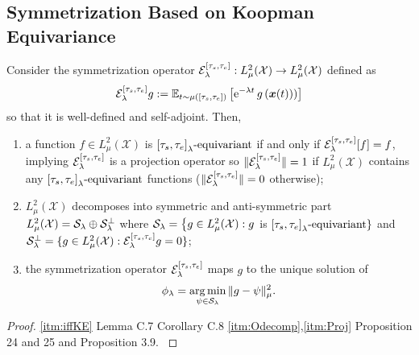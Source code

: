 \subsection{Symmetrization Based on Koopman Equivariance}

\begin{theorem}
Consider the symmetrization operator ${{\mathcal{E}}^{{[\tau_s,\tau_e]}}_{{\lambda}}}: L_{\mu}^2(\mathcal{X}) \rightarrow L_{\mu}^2(\mathcal{X})$ defined as
\begin{align}\label{eq:EqvarEOSupp}
    {{\mathcal{E}}^{{[\tau_s,\tau_e]}}_{{\lambda}}} g := \mathbb{E}_{t \sim \mu{([\tau_s,\tau_e])}}\left[ \operatorname{e}^{-\lambda t} g\left(\bm{x}(t))\right)\right]
\end{align}
so that it is well-defined and self-adjoint. Then,
\begin{enumerate}[leftmargin=*,label=\roman*.]
\item \label{itm:iffKE} a function $f \in L_{\mu}^2(\mathcal{X})$ is ${{[\tau_s,\tau_e]}}_\lambda\textnormal{-equivariant}$ if and only if ${{\mathcal{E}}^{{[\tau_s,\tau_e]}}_{{\lambda}}}[f] = f$, implying ${{\mathcal{E}}^{{[\tau_s,\tau_e]}}_{{\lambda}}}$ is a projection operator so $\|{{\mathcal{E}}^{{[\tau_s,\tau_e]}}_{{\lambda}}}\|=1$ if $L_{\mu}^2(\mathcal{X})$ contains any ${{[\tau_s,\tau_e]}}_\lambda\textnormal{-equivariant}$ functions ($\|{{\mathcal{E}}^{{[\tau_s,\tau_e]}}_{{\lambda}}}\|=0$ otherwise); 
 \item \label{itm:Odecomp} $L_{\mu}^2(\mathcal{X})$ decomposes into symmetric and anti-symmetric part
$L_{\mu}^2(\mathcal{X})=\mathcal{S}_\lambda \oplus \mathcal{S}_\lambda^\perp$
where $\mathcal{S}_\lambda=\left\{g \in L_{\mu}^2(\mathcal{X}): g\right.$ is  ${{[\tau_s,\tau_e]}}_\lambda\textnormal{-equivariant}\}$ and $\mathcal{S}_\lambda^\perp=\{g \in L_{\mu}^2(\mathcal{X}):{{\mathcal{E}}^{{[\tau_s,\tau_e]}}_{{\lambda}}}  g=0\}$;
\item \label{itm:Proj}
the symmetrization operator
${{\mathcal{E}}^{{[\tau_s,\tau_e]}}_{{\lambda}}}$ maps $g$ to the unique solution of
\begin{align}
    \phi_{\lambda} = \operatorname*{arg\,min}_{\psi \in \mathcal{S}_\lambda} \| g - \psi \|^2_{\mu}.
\end{align}
\end{enumerate}
\begin{proof}
\ref{itm:iffKE} Lemma C.7 Corollary C.8 \citep{elesedy21a} 
\ref{itm:Odecomp},\ref{itm:Proj} Proposition 24 and 25 \citep{elesedy21a} and Proposition 3.9. \citep{Elesedy2023}
\end{proof}
\end{theorem}








